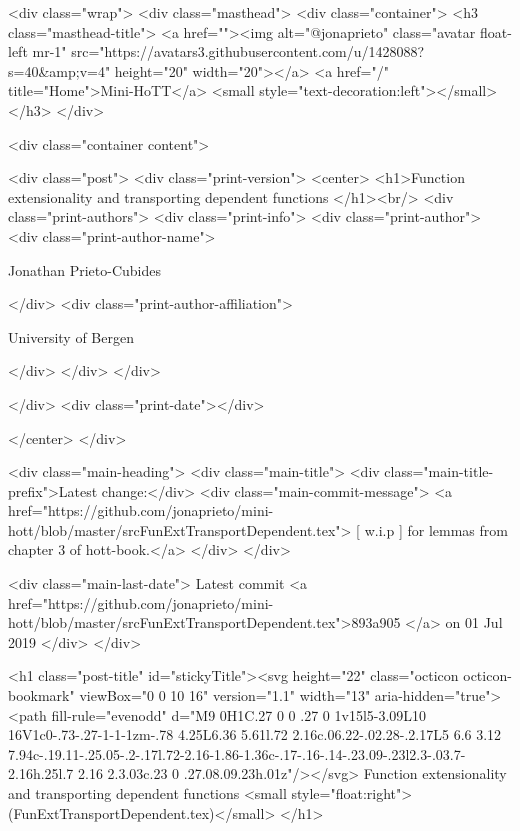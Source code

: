    <div class="wrap">
      <div class="masthead">
        <div class="container">
          <h3 class="masthead-title">
            <a href=""><img alt="@jonaprieto" class="avatar float-left mr-1" src="https://avatars3.githubusercontent.com/u/1428088?s=40&amp;v=4" height="20" width="20"></a>
            <a href="/" title="Home">Mini-HoTT</a>
            <small style="text-decoration:left"></small>
          </h3>
        </div>
      
      <div class="container content">
        







<div class="post">
  <div class="print-version">
    <center>
      <h1>Function extensionality and transporting dependent functions </h1><br/>
        <div class="print-authors">
          <div class="print-info">
            <div class="print-author">
              <div class="print-author-name">
                
                  Jonathan Prieto-Cubides
                
              </div>
              <div class="print-author-affiliation">
                
                  University of Bergen
                
                </div>
            </div>
          </div>
          
          
        </div>
        <div class="print-date"></div>
        
        
    </center>
  </div>

  
  <div class="main-heading">
    <div class="main-title">
      <div class="main-title-prefix">Latest change:</div>
      <div class="main-commit-message">
            <a href="https://github.com/jonaprieto/mini-hott/blob/master/srcFunExtTransportDependent.tex">
              [ w.i.p ] for lemmas from chapter 3 of hott-book.</a>
      </div>
    </div>

    <div class="main-last-date">
      Latest commit <a href="https://github.com/jonaprieto/mini-hott/blob/master/srcFunExtTransportDependent.tex">893a905 </a> on  01 Jul 2019
    </div>
  </div>
  

  <h1 class="post-title" id="stickyTitle"><svg height="22" class="octicon octicon-bookmark" viewBox="0 0 10 16" version="1.1" width="13" aria-hidden="true"><path fill-rule="evenodd" d="M9 0H1C.27 0 0 .27 0 1v15l5-3.09L10 16V1c0-.73-.27-1-1-1zm-.78 4.25L6.36 5.61l.72 2.16c.06.22-.02.28-.2.17L5 6.6 3.12 7.94c-.19.11-.25.05-.2-.17l.72-2.16-1.86-1.36c-.17-.16-.14-.23.09-.23l2.3-.03.7-2.16h.25l.7 2.16 2.3.03c.23 0 .27.08.09.23h.01z"/></svg> Function extensionality and transporting dependent functions  <small style="float:right">(FunExtTransportDependent.tex)</small>
  </h1>

